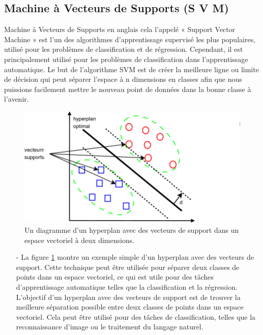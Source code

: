 \subsection{Machine à Vecteurs de Supports (S V M) }
Machine à Vecteurs de Supports en anglais cela l'appelé « Support Vector Machine » est l’un des algorithmes d’apprentissage supervisé les plus populaires, utilisé pour les problèmes de classification et de régression. 
Cependant, il est principalement utilisé pour les problèmes de classification dans l’apprentissage automatique. Le but de l’algorithme SVM est de créer la meilleure ligne ou limite de décision qui peut séparer l’espace à n dimensions en classes afin que nous puissions facilement mettre le nouveau point de données dans la bonne classe à l’avenir.

\begin{figure}[!h]
\centering
\includegraphics[scale=0.5]{Images/Les-vecteurs-de-support.png}
\caption{Un diagramme d'un hyperplan avec des vecteurs de support dans un espace vectoriel à deux dimensions.}
\label{fig:06}
\end{figure}


\begin{itemize}
\item[-] La figure \ref{fig:06} montre un exemple simple d'un hyperplan avec des vecteurs de support. Cette technique peut être utilisée pour séparer deux classes de points dans un espace vectoriel, ce qui est utile pour des tâches d'apprentissage automatique telles que la classification et la régression.
L'objectif d'un hyperplan avec des vecteurs de support est de trouver la meilleure séparation possible entre deux classes de points dans un espace vectoriel. Cela peut être utilisé pour des tâches de classification, telles que la reconnaissance d'image ou le traitement du langage naturel.
\end{itemize}

